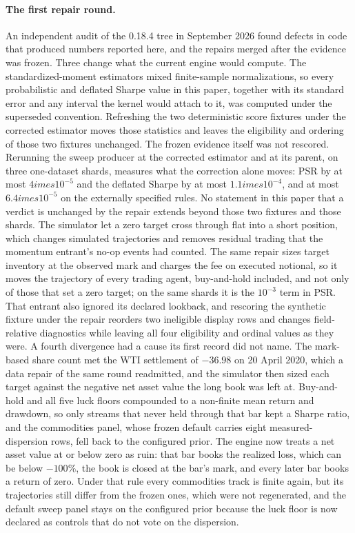 \paragraph{The first repair round.} An independent audit of the 0.18.4 tree in September 2026 found defects in code that produced numbers reported here, and the repairs merged after the evidence was frozen. Three change what the current engine would compute. The standardized-moment estimators mixed finite-sample normalizations, so every probabilistic and deflated Sharpe value in this paper, together with its standard error and any interval the kernel would attach to it, was computed under the superseded convention. Refreshing the two deterministic score fixtures under the corrected estimator moves those statistics and leaves the eligibility and ordering of those two fixtures unchanged. The frozen evidence itself was not rescored. Rerunning the sweep producer at the corrected estimator and at its parent, on three one-dataset shards, measures what the correction alone moves: PSR by at most $4	imes10^{-5}$ and the deflated Sharpe by at most $1.1	imes10^{-4}$, and at most $6.4	imes10^{-5}$ on the externally specified rules. No statement in this paper that a verdict is unchanged by the repair extends beyond those two fixtures and those shards. The simulator let a zero target cross through flat into a short position, which changes simulated trajectories and removes residual trading that the momentum entrant's no-op events had counted. The same repair sizes target inventory at the observed mark and charges the fee on executed notional, so it moves the trajectory of every trading agent, buy-and-hold included, and not only of those that set a zero target; on the same shards it is the $10^{-3}$ term in PSR. That entrant also ignored its declared lookback, and rescoring the synthetic fixture under the repair reorders two ineligible display rows and changes field-relative diagnostics while leaving all four eligibility and ordinal values as they were. A fourth divergence had a cause its first record did not name. The mark-based share count met the WTI settlement of $-36.98$ on 20 April 2020, which a data repair of the same round readmitted, and the simulator then sized each target against the negative net asset value the long book was left at. Buy-and-hold and all five luck floors compounded to a non-finite mean return and drawdown, so only streams that never held through that bar kept a Sharpe ratio, and the commodities panel, whose frozen default carries eight measured-dispersion rows, fell back to the configured prior. The engine now treats a net asset value at or below zero as ruin: that bar books the realized loss, which can be below $-100\%$, the book is closed at the bar's mark, and every later bar books a return of zero. Under that rule every commodities track is finite again, but its trajectories still differ from the frozen ones, which were not regenerated, and the default sweep panel stays on the configured prior because the luck floor is now declared as controls that do not vote on the dispersion.

